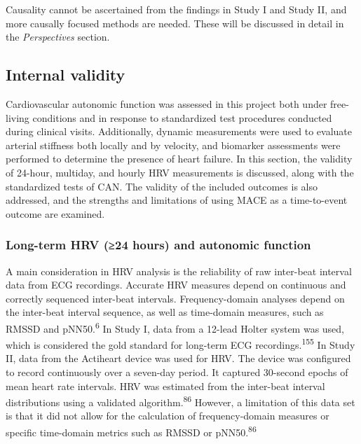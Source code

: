 \documentclass[
  a4paper,
  headsepline=true,
  open=left]{scrbook}
\begin{document}
Causality cannot be ascertained from the findings in Study I and Study
II, and more causally focused methods are needed. These will be
discussed in detail in the \emph{Perspectives} section.

\hypertarget{internal-validity}{%
\subsection{Internal validity}\label{internal-validity}}

Cardiovascular autonomic function was assessed in this project both
under free-living conditions and in response to standardized test
procedures conducted during clinical visits. Additionally, dynamic
measurements were used to evaluate arterial stiffness both locally and
by velocity, and biomarker assessments were performed to determine the
presence of heart failure. In this section, the validity of 24-hour,
multiday, and hourly HRV measurements is discussed, along with the
standardized tests of CAN. The validity of the included outcomes is also
addressed, and the strengths and limitations of using MACE as a
time-to-event outcome are examined.

\hypertarget{long-term-hrv-24-hours-and-autonomic-function}{%
\subsubsection{Long-term HRV (≥24 hours) and autonomic
function}\label{long-term-hrv-24-hours-and-autonomic-function}}

A main consideration in HRV analysis is the reliability of raw
inter-beat interval data from ECG recordings. Accurate HRV measures
depend on continuous and correctly sequenced inter-beat intervals.
Frequency-domain analyses depend on the inter-beat interval sequence, as
well as time-domain measures, such as RMSSD and
pNN50.\textsuperscript{6} In Study I, data from a 12-lead Holter system
was used, which is considered the gold standard for long-term ECG
recordings.\textsuperscript{155} In Study II, data from the Actiheart
device was used for HRV. The device was configured to record
continuously over a seven-day period. It captured 30-second epochs of
mean heart rate intervals. HRV was estimated from the inter-beat
interval distributions using a validated algorithm.\textsuperscript{86}
However, a limitation of this data set is that it did not allow for the
calculation of frequency-domain measures or specific time-domain metrics
such as RMSSD or pNN50.\textsuperscript{86}
\end{document}
